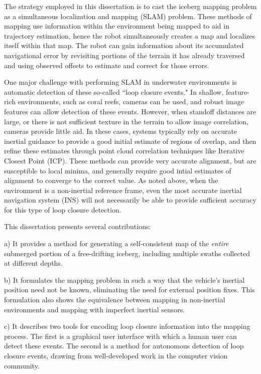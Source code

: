 The strategy employed in this dissertation is to cast the iceberg mapping problem as a simultaneous localization and mapping (SLAM) problem. These methods of mapping use information within the environment being mapped to aid in trajectory estimation, hence the robot simultaneously creates a map and localizes itself within that map. The robot can gain information about its accumulated navigational error by revisiting portions of the terrain it has already traversed and using observed offsets to estimate and correct for those errors. 

One major challenge with performing SLAM in underwater environments is automatic detection of these so-called ``loop closure events." In shallow, feature-rich environments, such as coral reefs, cameras can be used, and robust image features can allow detection of these events. However, when standoff distances are large, or there is not sufficient texture in the terrain to allow image correlation, cameras provide little aid. In these cases, systems typically rely on accurate inertial guidance to provide a good initial estimate of regions of overlap, and then refine these estimates through point cloud correlation techniques like Iterative Closest Point (ICP). These methods can provide very accurate alignment, but are susceptible to local minima, and generally require good intial estimates of alignment to converge to the correct value. As noted above, when the environment is a non-inertial reference frame, even the most accurate inertial navigation system (INS) will not necessarily be able to provide sufficient accuracy for this type of loop closure detection. 

This dissertation presents several contributions: 

a) It provides a method for generating a self-consistent map of the \emph{entire} submerged portion of a free-drifting iceberg, including multiple swaths collected at different depths.

b) It formulates the mapping problem in such a way that the vehicle's inertial position need not be known, eliminating the need for external position fixes. This formulation also shows the equivalence between mapping in non-inertial environments and mapping with imperfect inertial sensors. 

c) It describes two tools for encoding loop closure information into the mapping process. The first is a graphical user interface with which a human user can detect these events. The second is a method for autonomous detection of loop closure events, drawing from well-developed work in the computer vision community.

